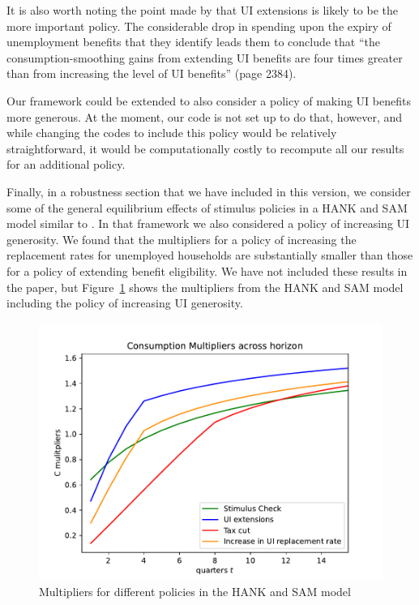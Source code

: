 \documentclass[12pt,letterpaper,english]{article}
\begin{document}
\begin{enumerate}
\begin{enumerate}
		It is also worth noting the point made by \citet{ganongconsumer2019} that UI extensions is likely to be the more important policy. The considerable drop in spending upon the expiry of unemployment benefits that they identify leads them to conclude that ``the consumption-smoothing gains from extending UI benefits are four times greater than from increasing the level of UI benefits'' (page 2384).
		
		Our framework could be extended to also consider a policy of making UI benefits more generous. At the moment, our code is not set up to do that, however, and while changing the codes to include this policy would be relatively straightforward, it would be computationally costly to recompute all our results for an additional policy. 

		Finally, in a robustness section that we have included in this version, we consider some of the general equilibrium effects of stimulus policies in a HANK and SAM model similar to \citet{Ravn2017}. In that framework we also considered a policy of increasing UI generosity. We found that the multipliers for a policy of increasing the replacement rates for unemployed households are substantially smaller than those for a policy of extending benefit eligibility. We have not included these results in the paper, but Figure~\ref{fig:multHANKSAM} shows the multipliers from the HANK and SAM model including the policy of increasing UI generosity.
		
		\begin{figure}
			\begin{center}
				\includegraphics[width=.65\textwidth]{../../../../Code/HA-Models/FromPandemicCode/Figures/HANK_Figures/HANK_multipliers_w_splurge_and_generosity}
				\caption{Multipliers for different policies in the HANK and SAM model}
				\label{fig:multHANKSAM}
			\end{center}			
		\end{figure}
	

\end{enumerate}
\end{enumerate}
\end{document}
